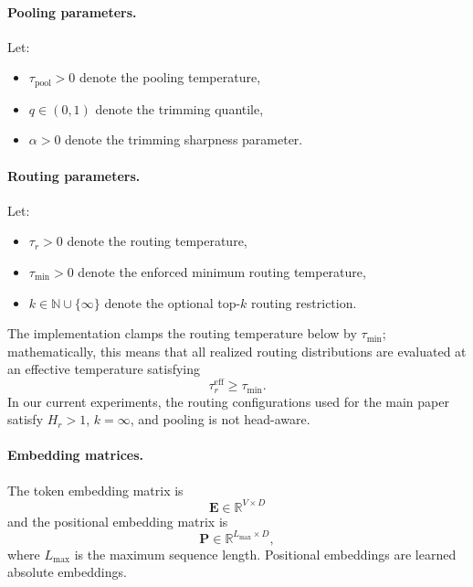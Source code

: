 \documentclass{article}
\theoremstyle{plain}
\theoremstyle{definition}
\theoremstyle{remark}
\begin{document}
\paragraph{Pooling parameters.}
Let:
\begin{itemize}
    \item $\tau_{\mathrm{pool}} > 0$ denote the pooling temperature,
    \item $q \in (0,1)$ denote the trimming quantile,
    \item $\alpha > 0$ denote the trimming sharpness parameter.
\end{itemize}

\paragraph{Routing parameters.}
Let:
\begin{itemize}
    \item $\tau_r > 0$ denote the routing temperature,
    \item $\tau_{\min} > 0$ denote the enforced minimum routing temperature,
    \item $k \in \mathbb{N} \cup \{\infty\}$ denote the optional top-$k$ routing restriction.
\end{itemize}
The implementation clamps the routing temperature below by $\tau_{\min}$; mathematically, this means that all realized routing distributions are evaluated at an effective temperature satisfying
\begin{equation}
\label{eq:tau-clamp}
\tau_r^{\mathrm{eff}} \ge \tau_{\min}.
\end{equation}
In our current experiments, the routing configurations used for the main paper satisfy $H_r>1$, $k=\infty$, and pooling is not head-aware.

\paragraph{Embedding matrices.}
The token embedding matrix is
\begin{equation}
\label{eq:token-embedding}
\mathbf{E} \in \mathbb{R}^{V \times D}
\end{equation}
and the positional embedding matrix is
\begin{equation}
\label{eq:pos-embedding}
\mathbf{P} \in \mathbb{R}^{L_{\max} \times D},
\end{equation}
where $L_{\max}$ is the maximum sequence length. Positional embeddings are learned absolute embeddings.
\end{document}
